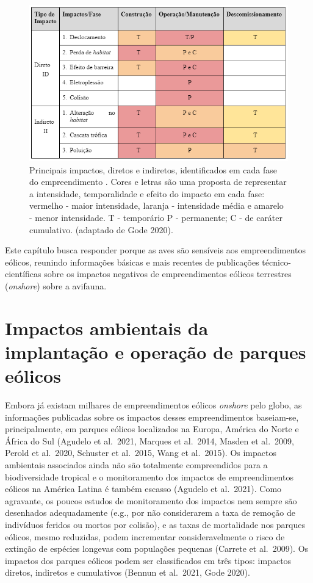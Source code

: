 \documentclass[
  oneside]{scrbook}
\begin{document}
\begin{figure}[H]

{\centering \includegraphics[width=0.75\linewidth]{imagens/cap04/Figura_4.1} 

}

\caption{Principais impactos, diretos e indiretos, identificados em cada fase do empreendimento . Cores e letras são uma proposta de representar a intensidade, temporalidade e efeito do impacto em cada fase: vermelho - maior intensidade, laranja - intensidade média e amarelo - menor intensidade. T - temporário P  -  permanente; C - de caráter cumulativo. (adaptado de Gode 2020).}\label{fig:12}
\end{figure}

Este capítulo busca responder porque as aves são sensíveis aos empreendimentos eólicos, reunindo informações básicas e mais recentes de publicações técnico-científicas sobre os impactos negativos de empreendimentos eólicos terrestres (\emph{onshore}) sobre a avifauna.

\hypertarget{impactos-ambientais-da-implantauxe7uxe3o-e-operauxe7uxe3o-de-parques-euxf3licos}{%
\section{Impactos ambientais da implantação e operação de parques eólicos}\label{impactos-ambientais-da-implantauxe7uxe3o-e-operauxe7uxe3o-de-parques-euxf3licos}}

Embora já existam milhares de empreendimentos eólicos \emph{onshore} pelo globo, as informações publicadas sobre os impactos desses empreendimentos baseiam-se, principalmente, em parques eólicos localizados na Europa, América do Norte e África do Sul (Agudelo et al.~2021, Marques et al.~2014, Masden et al.~2009, Perold et al.~2020, Schuster et al.~2015, Wang et al.~2015). Os impactos ambientais associados ainda não são totalmente compreendidos para a biodiversidade tropical e o monitoramento dos impactos de empreendimentos eólicos na América Latina é também escasso (Agudelo et al.~2021). Como agravante, os poucos estudos de monitoramento dos impactos nem sempre são desenhados adequadamente (e.g., por não considerarem a taxa de remoção de indivíduos feridos ou mortos por colisão), e as taxas de mortalidade nos parques eólicos, mesmo reduzidas, podem incrementar consideravelmente o risco de extinção de espécies longevas com populações pequenas (Carrete et al.~2009). Os impactos dos parques eólicos podem ser classificados em três tipos: impactos diretos, indiretos e cumulativos (Bennun et al.~2021, Gode 2020).
\end{document}
